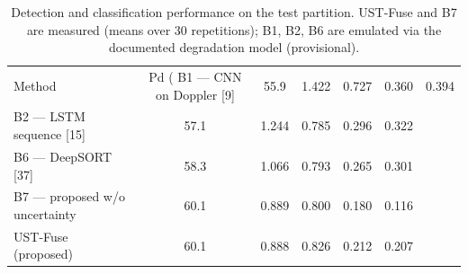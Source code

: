\begin{table}[t]
\centering
\caption{Detection and classification performance on the test partition. UST-Fuse and B7 are measured (means over 30 repetitions); B1, B2, B6 are emulated via the documented degradation model (provisional).}
\label{tab:detection}
\begin{tabular}{lccccc}
\hline
Method & Pd (%
\hline
B1 — CNN on Doppler [9] & 55.9 & 1.422 & 0.727 & 0.360 & 0.394 \\
B2 — LSTM sequence [15] & 57.1 & 1.244 & 0.785 & 0.296 & 0.322 \\
B6 — DeepSORT [37] & 58.3 & 1.066 & 0.793 & 0.265 & 0.301 \\
B7 — proposed w/o uncertainty & 60.1 & 0.889 & 0.800 & 0.180 & 0.116 \\
UST-Fuse (proposed) & 60.1 & 0.888 & 0.826 & 0.212 & 0.207 \\
\hline
\end{tabular}
\end{table}
